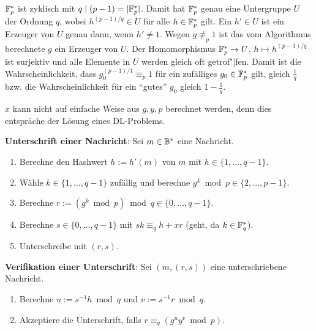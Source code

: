 \linie

$\mathbb{F}_p^\ast$ ist zyklisch mit $q \mid (p - 1) = |\mathbb{F}_p^\ast|$.
Damit hat $\mathbb{F}_p^\ast$ genau eine Untergruppe $U$ der Ordnung $q$,
wobei $h^{(p-1)/q} \in U$ für alle $h \in \mathbb{F}_p^\ast$ gilt.
Ein $h' \in U$ ist ein Erzeuger von $U$ genau dann, wenn $h' \not= 1$.
Wegen $g \not\equiv_p 1$ ist das vom Algorithmus berechnete $g$ ein Erzeuger von $U$.
Der Homomorphismus $\mathbb{F}_p^\ast \to U$, $h \mapsto h^{(p-1)/q}$ ist surjektiv und
alle Elemente in $U$ werden gleich oft getrof"|fen.
Damit ist die Wahrscheinlichkeit, dass $g_0^{(p-1)/1} \equiv_p 1$ für ein zufälliges
$g_0 \in \mathbb{F}_p^\ast$ gilt, gleich $\frac{1}{q}$ bzw.
die Wahrscheinlichkeit für ein "`gutes"' $g_0$ gleich $1 - \frac{1}{q}$.

$x$ kann nicht auf einfache Weise aus $g, y, p$ berechnet werden,
denn dies entspräche der Lösung eines DL-Problems.

\linie

\textbf{Unterschrift einer Nachricht}:
Sei $m \in \mathbb{B}^\ast$ eine Nachricht.
\begin{enumerate}
    \item
    Berechne den Hashwert $h := h'(m)$ von $m$ mit $h \in \{1, \dotsc, q - 1\}$. 
    
    \item
    Wähle $k \in \{1, \dotsc, q - 1\}$ zufällig und berechne
    $g^k \bmod p \in \{2, \dotsc, p - 1\}$.
    
    \item
    Berechne $r := (g^k \bmod p) \bmod q \in \{0, \dotsc, q-1\}$.
    
    \item
    Berechne $s \in \{0, \dotsc, q-1\}$ mit $sk \equiv_q h + xr$
    (geht, da $k \in \mathbb{F}_q^\ast$).
    
    \item
    Unterschreibe mit $(r, s)$.
\end{enumerate}

\textbf{Verifikation einer Unterschrift}:
Sei $(m, (r, s))$ eine unterschriebene Nachricht.
\begin{enumerate}
    \item
    Berechne $u := s^{-1} h \bmod q$ und $v := s^{-1} r \bmod q$.
    
    \item
    Akzeptiere die Unterschrift, falls $r \equiv_q (g^u y^v \bmod p)$.
\end{enumerate}

\linie

